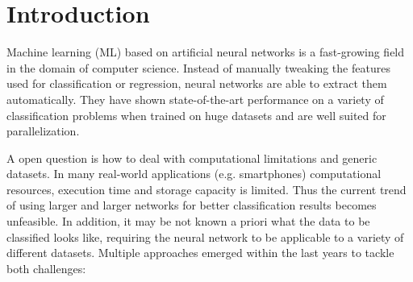 \documentclass{article}
\begin{document}
\begin{abstract}
This documentation summarizes the progress of the automl{\textunderscore}freiburg video team on the AutoDL $2019-2020$ challenge. Two methods are presented: The first method relies on transfer learning of a single, pretrained video classification network which is fine tuned during the challenge. As this approach has shown several limitations if the test datasets vary too much, a more elaborate method based on meta learning is developed: Multiple classification networks are evaluated on different training datasets a priori and the incumbent for every dataset is stored in a lookup table. During test time, the similarity between the test dataset and all training datasets is measured and the incumbent of the most similar training dataset is used for training/evaluation on the test dataset. The first method has been submitted and evaluated on the AutoCV2 challenge and resulted in a mediocre score. Four different approaches are presented and evaluated for the second method, resulting in scores almost on par with the best performing image and video classification team.
\end{abstract}




\section{Introduction}
Machine learning (ML) based on artificial neural networks is a fast-growing field in the domain of computer science. Instead of manually tweaking the features used for classification or regression, neural networks are able to extract them automatically. They have shown state-of-the-art performance on a variety of classification problems when trained on huge datasets and are well suited for parallelization. 

A open question is how to deal with computational limitations and generic datasets. In many real-world applications (e.g. smartphones) computational resources, execution time and storage capacity is limited. Thus the current trend of using larger and larger networks for better classification results becomes unfeasible. In addition, it may be not known a priori what the data to be classified looks like, requiring the neural network to be applicable to a variety of different datasets. Multiple approaches emerged within the last years to tackle both challenges:
\end{document}
